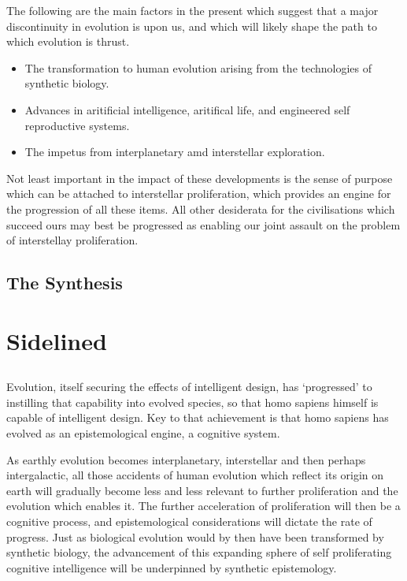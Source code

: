The following are the main factors in the present which suggest that a major discontinuity in evolution is upon us, and which will likely shape the path to which evolution is thrust.

\begin{itemize}
\item The transformation to  human evolution arising from the technologies of synthetic biology.
\item Advances in aritificial intelligence, aritifical life, and engineered self reproductive systems.
\item The impetus from interplanetary amd interstellar exploration.
\end{itemize}

Not least important in the impact of these developments is the sense of purpose which can be attached to interstellar proliferation, which  provides an engine for the progression of all these items.
All other desiderata for the civilisations which succeed ours may best be progressed as enabling our joint assault on the problem of interstellay proliferation.

\section{The Synthesis}





\chapter{Sidelined}


\section{}

Evolution, itself securing the effects of intelligent design, has `progressed' to instilling that capability into evolved species, so that homo sapiens himself is capable of intelligent design.
Key to that achievement is that homo sapiens has evolved as an epistemological engine, a cognitive system.

As earthly evolution becomes interplanetary, interstellar and then perhaps intergalactic, all those accidents of human evolution which reflect its origin on earth will gradually become less and less relevant to further proliferation and the evolution which enables it.
The further acceleration of proliferation will then be a cognitive process, and epistemological considerations will dictate the rate of progress.
Just as biological evolution would by then have been transformed by synthetic biology, the advancement of this expanding sphere of self proliferating cognitive intelligence will be underpinned by synthetic epistemology.

